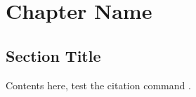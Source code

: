 \chapter{Chapter Name}\label{chap:one}
\section{Section Title}

Contents here, test the citation command \cite{Li2012}.
